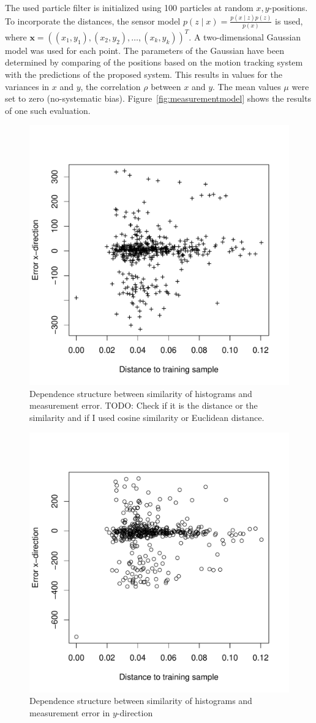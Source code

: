 \documentclass{report}
\begin{document}
The used particle filter is initialized using 100 particles at random
$x, y$-positions. To incorporate the distances, the sensor model
$p(z \mid x) = \frac{p(x \mid z)p(z)}{p(x)}$ is used, where
$\textbf{x} = ((x_1, y_1), (x_2, y_2), \ldots, (x_k, y_k))^T$. A
two-dimensional Gaussian model was used for each point. The parameters
of the Gaussian have been determined by comparing of the positions
based on the motion tracking system with the predictions of the
proposed system. This results in values for the variances in $x$ and
$y$, the correlation $\rho$ between $x$ and $y$. The mean values $\mu$
were set to zero (no-systematic
bias). Figure~\ref{fig:measurementmodel} shows the results of one such
evaluation.

\begin{figure}[h!]
\begin{center}
  \includegraphics[width=0.448\columnwidth]{dependency_dist_error_x}
  \caption{{\label{fig:cor_sim_confi} Dependence structure between
      similarity of histograms and measurement error.  TODO: Check if
      it is the distance or the similarity and if I used cosine
      similarity or Euclidean distance.%
    }}
\end{center}
\end{figure}

\begin{figure}[h!]
\begin{center}
\includegraphics[width=0.448\columnwidth]{dependency_dist_error_y}
\caption{{\label{fig:cor_sim_confi_y}
Dependence structure between similarity of histograms and measurement error in $y$-direction%
}}
\end{center}
\end{figure}
\end{document}
